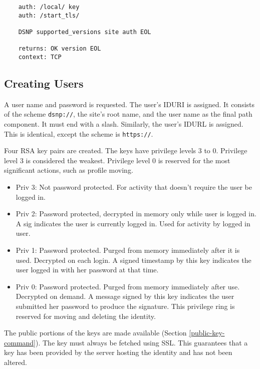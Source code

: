 \documentclass[letterpaper,11pt,oneside]{article}
\begin{document}
\vspace{10pt}
\begin{verbatim}
    auth: /local/ key
    auth: /start_tls/

    DSNP supported_versions site auth EOL

    returns: OK version EOL
    context: TCP
\end{verbatim}

\subsection{Creating Users}

A user name and password is requested. The user's IDURI is assigned. It
consists of the scheme \verb'dsnp://', the site's root name, and the user name
as the final path component. It must end with a slash. Similarly, the user's
IDURL is assigned. This is identical, except the scheme is \verb'https://'.

%
%

Four RSA key pairs are created. The keys have privilege levels 3 to 0.
Privilege level 3 is considered the weakest. Privilege level 0 is reserved for
the most significant actions, such as profile moving.

\begin{itemize}
\item Priv 3: Not password protected. For activity that doesn't require the user be logged
in.

\item Priv 2: Password protected, decrypted in memory only while user is logged
in. A sig indicates the user is currently logged in. Used for activity by
logged in user.

\item Priv 1: Password protected. Purged from memory immediately after it is
used. Decrypted on each login. A signed timestamp by this key indicates the
user logged in with her password at that time.

\item Priv 0: Password protected. Purged from memory immediately after use.
Decrypted on demand. A message signed by this key indicates the user submitted
her password to produce the signature. This privilege ring is reserved for
moving and deleting the identity.
\end{itemize}

The public portions of the keys are made available (Section
\ref{public-key-command}). The key must always be fetched using SSL. This
guarantees that a key has been provided by the server hosting the identity and
has not been altered.
\end{document}
